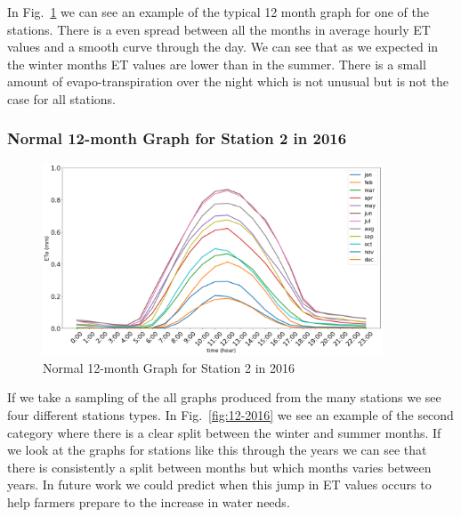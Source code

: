 \begin{frame}
	In Fig.~\ref{fig:2-2016} we can see an example of the typical 12 month graph for one of the stations. There is a even spread between all the months in average hourly ET values and a smooth curve through the day. We can see that as we expected in the winter months ET values are lower than in the summer. There is a small amount of evapo-transpiration over the night which is not unusual but is not the case for all stations. 
\end{frame}

\begin{frame}
\frametitle{Normal 12-month Graph for Station 2 in 2016}
\centering
\begin{figure}
	\includegraphics[width=0.9\textwidth]{images/2-2016.png}
	\caption{Normal 12-month Graph for Station 2 in 2016}\label{fig:2-2016}
\end{figure}
\end{frame}

\begin{frame}
	If we take a sampling of the all graphs produced from the many stations we see four different stations types. In Fig.~\ref{fig:12-2016} we see an example of the second category where there is a clear split between the winter and summer months. If we look at the graphs for stations like this through the years we can see that there is consistently a split between months but which months varies between years. In future work we could predict when this jump in ET values occurs to help farmers prepare to the increase in water needs. 
\end{frame}

